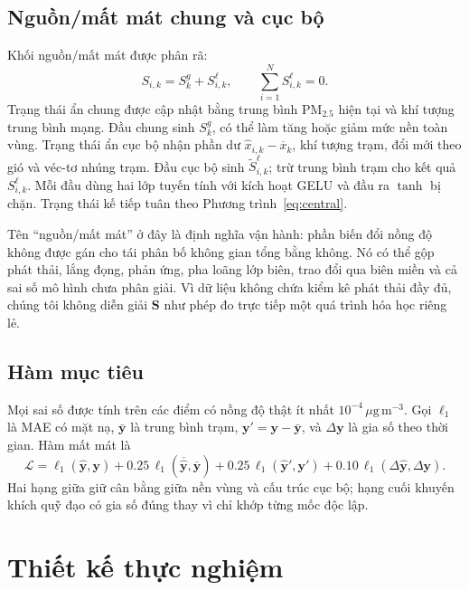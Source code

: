 \documentclass[10pt,a4paper]{article}
\newcommand{\pmfine}{PM$_{2.5}$}
\newcommand{\unitpm}{\,\mu\mathrm{g}\,\mathrm{m}^{-3}}
\newcommand{\meanN}[1]{\overline{#1}}
\begin{document}
\subsection{Nguồn/mất mát chung và cục bộ}

Khối nguồn/mất mát được phân rã:
\begin{equation}
  S_{i,k}=S^{g}_{k}+S^{\ell}_{i,k},
  \qquad
  \sum_{i=1}^{N}S^{\ell}_{i,k}=0.
  \label{eq:source}
\end{equation}
Trạng thái ẩn chung được cập nhật bằng trung bình \pmfine{} hiện tại và khí tượng trung bình mạng. Đầu chung sinh $S^g_k$, có thể làm tăng hoặc giảm mức nền toàn vùng. Trạng thái ẩn cục bộ nhận phần dư $\widehat{x}_{i,k}-\meanN{x}_k$, khí tượng trạm, đổi mới theo gió và véc-tơ nhúng trạm. Đầu cục bộ sinh $\widetilde{S}^{\ell}_{i,k}$; trừ trung bình trạm cho kết quả $S^{\ell}_{i,k}$. Mỗi đầu dùng hai lớp tuyến tính với kích hoạt GELU và đầu ra $\tanh$ bị chặn. Trạng thái kế tiếp tuân theo Phương trình~\eqref{eq:central}.

Tên ``nguồn/mất mát'' ở đây là định nghĩa vận hành: phần biến đổi nồng độ không được gán cho tái phân bố không gian tổng bằng không. Nó có thể gộp phát thải, lắng đọng, phản ứng, pha loãng lớp biên, trao đổi qua biên miền và cả sai số mô hình chưa phân giải. Vì dữ liệu không chứa kiểm kê phát thải đầy đủ, chúng tôi không diễn giải $\bm{S}$ như phép đo trực tiếp một quá trình hóa học riêng lẻ.

\subsection{Hàm mục tiêu}

Mọi sai số được tính trên các điểm có nồng độ thật ít nhất $10^{-4}\unitpm$. Gọi $\ell_1$ là MAE có mặt nạ, $\bar{\bm{y}}$ là trung bình trạm, $\bm{y}'=\bm{y}-\bar{\bm{y}}$, và $\Delta\bm{y}$ là gia số theo thời gian. Hàm mất mát là
\begin{equation}
  \mathcal{L}
  = \ell_1(\widehat{\bm{y}},\bm{y})
  +0.25\,\ell_1(\meanN{\widehat{\bm{y}}},\meanN{\bm{y}})
  +0.25\,\ell_1(\widehat{\bm{y}}',\bm{y}')
  +0.10\,\ell_1(\Delta\widehat{\bm{y}},\Delta\bm{y}).
  \label{eq:loss}
\end{equation}
Hai hạng giữa giữ cân bằng giữa nền vùng và cấu trúc cục bộ; hạng cuối khuyến khích quỹ đạo có gia số đúng thay vì chỉ khớp từng mốc độc lập.

\section{Thiết kế thực nghiệm}
\end{document}
